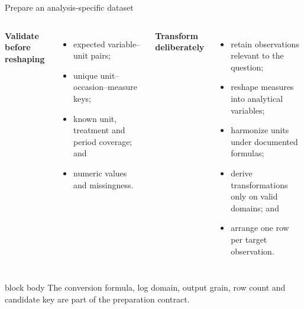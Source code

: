 \documentclass[10pt,aspectratio=169]{beamer}
\begin{document}
\begin{frame}{Prepare an analysis-specific dataset}

\small

\begin{columns}[T]


\textbf{Validate before reshaping}

\begin{itemize}
  \item expected variable--unit pairs;
  \item unique unit--occasion--measure keys;
  \item known unit, treatment and period coverage; and
  \item numeric values and missingness.
\end{itemize}


\textbf{Transform deliberately}

\begin{itemize}
  \item retain observations relevant to the question;
  \item reshape measures into analytical variables;
  \item harmonize units under documented formulas;
  \item derive transformations only on valid domains; and
  \item arrange one row per target observation.
\end{itemize}

\end{columns}

\vspace{0.35cm}

\begin{beamercolorbox}[rounded=true,sep=8pt]{block body}
The conversion formula, log domain, output grain, row count and candidate key are part of the preparation contract.
\end{beamercolorbox}

\end{frame}
\end{document}
